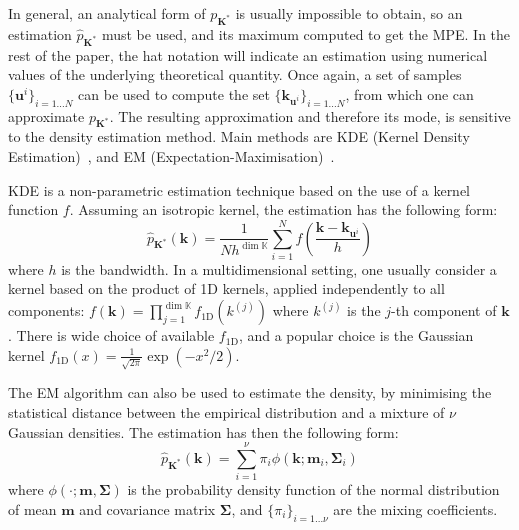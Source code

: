 \documentclass[preprint, review, 1p]{elsarticle}
\newcommand{\Kspace}{\mathbb{K}}
\begin{document}
In general, an analytical form of $p_{\mathbf{K}^*}$ is usually impossible to obtain, so an estimation $\hat{p}_{\mathbf{K}^*}$ must be used, and its maximum computed to get the MPE.
In the rest of the paper, the hat notation will indicate an estimation using numerical values of the underlying theoretical quantity.
Once again, a set of samples  $\{\mathbf{u}^i\}_{i=1\dots N}$ can be used to compute the set $\{\mathbf{k}_{\mathbf{u}^i}\}_{i=1\dots N}$, from which one can 
approximate  $p_{\mathbf{K}^*}$. The resulting approximation and therefore its mode, is sensitive to the density estimation method. Main methods are KDE (Kernel Density Estimation)~\citep{silverman_density_2018}, and EM (Expectation-Maximisation)~\citep{dempster_maximum_1977}.


KDE is a non-parametric estimation technique based on the use of a kernel function $f$. Assuming an isotropic kernel, the estimation has the following form:
\begin{equation}
\hat{p}_{\mathbf{K}^*}(\mathbf{k}) = \frac{1}{Nh^{\dim \Kspace}} \sum_{i=1}^N f\left(\frac{\mathbf{k} - \mathbf{k}_{\mathbf{u}^i}}{h}\right)
\end{equation}
where $h$ is the bandwidth. In a multidimensional setting, one usually consider a kernel based on the product of 1D kernels, applied independently to all components: $f(\mathbf{k}) = \prod_{j=1}^{\dim \Kspace} f_{\mathrm{1D}} (k^{(j)})$
where $k^{(j)}$ is the $j$-th component of $\mathbf{k}$.  There is wide choice of available $f_{\mathrm{1D}}$, and a popular choice is  %
the Gaussian kernel $f_{\mathrm{1D}}(x)= \frac{1}{\sqrt{2\pi}}\exp(-x^2 / 2)$. %

The EM algorithm can also be used to estimate the density, by minimising the statistical distance between the empirical distribution and a mixture of $\nu$ Gaussian densities. The estimation has then the following form:
\begin{equation}
\hat{p}_{\mathbf{K}^*}(\mathbf{k}) = \sum_{i=1}^{\nu} \pi_i \phi(\mathbf{k}; \mathbf{m}_i, \mathbf{\Sigma}_i)
\end{equation}
where $\phi( \cdot; \mathbf{m}, \mathbf{\Sigma})$ is the probability density function of the normal distribution of mean $\mathbf{m}$ and covariance matrix $\mathbf{\Sigma}$, and $\{\pi_i \}_{i=1 \dots \nu}$ are the mixing coefficients.
\end{document}
